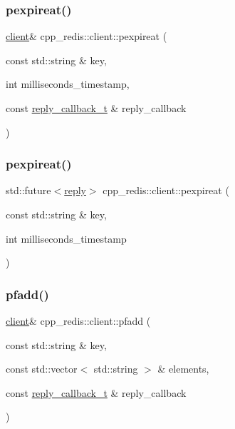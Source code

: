 \subsubsection{\texorpdfstring{pexpireat()}{pexpireat()}\hspace{0.1cm}{\footnotesize\ttfamily [1/2]}}
{\footnotesize\ttfamily \hyperlink{classcpp__redis_1_1client}{client}\& cpp\+\_\+redis\+::client\+::pexpireat (\begin{DoxyParamCaption}\item[{const std\+::string \&}]{key,  }\item[{int}]{milliseconds\+\_\+timestamp,  }\item[{const \hyperlink{classcpp__redis_1_1client_a061a1140d36d2eaeda82b09a0bb3f9f2}{reply\+\_\+callback\+\_\+t} \&}]{reply\+\_\+callback }\end{DoxyParamCaption})}

\mbox{\label{classcpp__redis_1_1client_af7aeaf2681d57fc30c8535c8d5df1e72}} 
\subsubsection{\texorpdfstring{pexpireat()}{pexpireat()}\hspace{0.1cm}{\footnotesize\ttfamily [2/2]}}
{\footnotesize\ttfamily std\+::future$<$\hyperlink{classcpp__redis_1_1reply}{reply}$>$ cpp\+\_\+redis\+::client\+::pexpireat (\begin{DoxyParamCaption}\item[{const std\+::string \&}]{key,  }\item[{int}]{milliseconds\+\_\+timestamp }\end{DoxyParamCaption})}

\mbox{\label{classcpp__redis_1_1client_ade84308f3ef8bfc75c092388ec538469}} 
\subsubsection{\texorpdfstring{pfadd()}{pfadd()}\hspace{0.1cm}{\footnotesize\ttfamily [1/2]}}
{\footnotesize\ttfamily \hyperlink{classcpp__redis_1_1client}{client}\& cpp\+\_\+redis\+::client\+::pfadd (\begin{DoxyParamCaption}\item[{const std\+::string \&}]{key,  }\item[{const std\+::vector$<$ std\+::string $>$ \&}]{elements,  }\item[{const \hyperlink{classcpp__redis_1_1client_a061a1140d36d2eaeda82b09a0bb3f9f2}{reply\+\_\+callback\+\_\+t} \&}]{reply\+\_\+callback }\end{DoxyParamCaption})}

